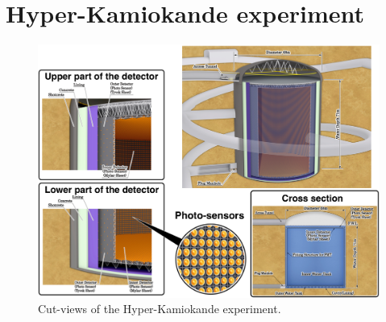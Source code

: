 \section{Hyper-Kamiokande experiment}
\label{sec:hk}

\begin{figure}
	\centering
	\includegraphics[width=0.8\linewidth]{pics/hkonlytank.png}
	\caption[Views of the Hyper-Kamiokande experiment]{Cut-views of the Hyper-Kamiokande experiment.}
	\label{fig:hkdr}
\end{figure}

